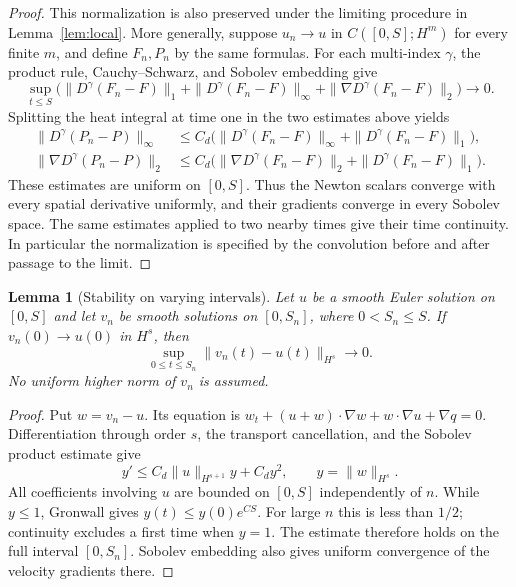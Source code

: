 \documentclass[11pt]{article}
\newtheorem{lemma}[theorem]{Lemma}
\theoremstyle{definition}
\begin{document}
\begin{proof}
This normalization is also preserved under the limiting procedure in
Lemma~\ref{lem:local}. More generally, suppose
$u_n\to u$ in $C([0,S];H^m)$ for every finite $m$, and define $F_n,P_n$
by the same formulas. For each multi-index $\gamma$, the product rule,
Cauchy--Schwarz, and Sobolev embedding give
\[
 \sup_{t\le S}\bigl(\|D^\gamma(F_n-F)\|_1+
                    \|D^\gamma(F_n-F)\|_\infty+
                    \|\nabla D^\gamma(F_n-F)\|_2\bigr)\longrightarrow0.
\]
Splitting the heat integral at time one in the two estimates above yields
\begin{align*}
 \|D^\gamma(P_n-P)\|_\infty
 &\le C_d\bigl(\|D^\gamma(F_n-F)\|_\infty+
                         \|D^\gamma(F_n-F)\|_1\bigr),\\
 \|\nabla D^\gamma(P_n-P)\|_2
 &\le C_d\bigl(\|\nabla D^\gamma(F_n-F)\|_2+
                         \|D^\gamma(F_n-F)\|_1\bigr).
\end{align*}
These estimates are uniform on $[0,S]$. Thus the Newton scalars converge
with every spatial derivative uniformly, and their gradients converge
in every Sobolev space. The same estimates applied to two nearby times
give their time continuity. In particular the normalization is specified
by the convolution before and after passage to the limit.
\end{proof}

\begin{lemma}[Stability on varying intervals]\label{lem:stability}
Let $u$ be a smooth Euler solution on $[0,S]$ and let $v_n$ be smooth
solutions on $[0,S_n]$, where $0<S_n\leq S$. If
$v_n(0)\to u(0)$ in $H^s$, then
\[
 \sup_{0\leq t\leq S_n}\|v_n(t)-u(t)\|_{H^s}\longrightarrow0.
\]
No uniform higher norm of $v_n$ is assumed.
\end{lemma}
\begin{proof}
Put $w=v_n-u$. Its equation is
$w_t+(u+w)\cdot\nabla w+w\cdot\nabla u+\nabla q=0$.
Differentiation through order $s$, the transport cancellation, and the
Sobolev product estimate give
\[
 y'\leq C_d\|u\|_{H^{s+1}}y+C_d y^2,
 \qquad y=\|w\|_{H^s}.
\]
All coefficients involving $u$ are bounded on $[0,S]$ independently of
$n$. While $y\leq1$, Gronwall gives $y(t)\leq y(0)e^{CS}$.
For large $n$ this is less than $1/2$; continuity excludes a first time
when $y=1$. The estimate therefore holds on the full interval
$[0,S_n]$. Sobolev embedding also gives uniform convergence of the
velocity gradients there.
\end{proof}
\end{document}
